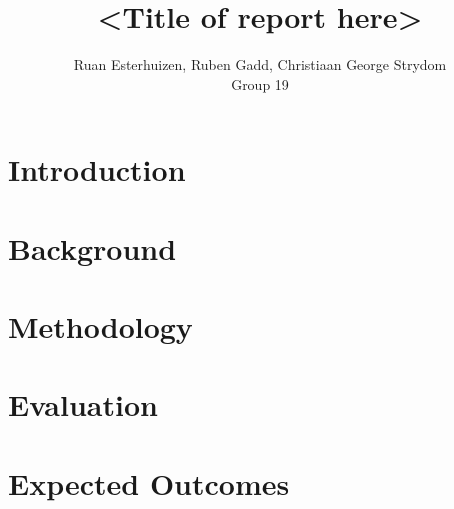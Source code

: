 \documentclass[11pt, a4paper]{article}
\title{<Title of report here> \\[1ex] \large <Subtitle here>}
\author{Ruan Esterhuizen, Ruben Gadd, Christiaan George Strydom \\[1ex] \large Group 19}
\date{}
\begin{document}
    \maketitle
    \section{Introduction}
    \section{Background}
    \section{Methodology}
    \section{Evaluation}
    \section{Expected Outcomes}
\end{document}
